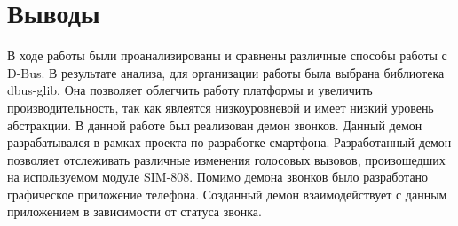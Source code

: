 \section{Выводы}
В ходе работы были проанализированы и сравнены различные способы работы с D-Bus. В результате анализа, для организации работы была выбрана библиотека dbus-glib. Она позволяет облегчить работу платформы и увеличить производительность, так как явлеятся низкоуровневой и имеет низкий уровень абстракции. 
В данной работе был реализован демон звонков. Данный демон разрабатывался в рамках проекта по разработке смартфона. Разработанный демон позволяет отслеживать различные изменения голосовых вызовов, произошедших на используемом модуле SIM-808. Помимо демона звонков было разработано графическое приложение телефона. Созданный демон взаимодействует с данным приложением в зависимости от статуса звонка.
